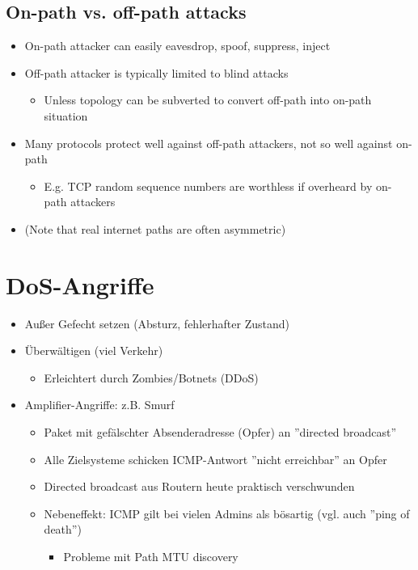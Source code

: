 \documentclass[openany]{book}
\begin{document}
\subsection{On-path vs. off-path attacks}

\begin{itemize}
    \item On-path attacker can easily eavesdrop, spoof, suppress, inject
    \item Off-path attacker is typically limited to blind attacks
    \begin{itemize}
        \item Unless topology can be subverted to convert off-path into on-path situation
    \end{itemize} 
    \item Many protocols protect well against off-path attackers, not so well against on-path
    \begin{itemize}
        \item E.g. TCP random sequence numbers are worthless if overheard by on-path attackers
    \end{itemize}
    \item (Note that real internet paths are often asymmetric)
\end{itemize}

\section{DoS-Angriffe}

\begin{itemize}
    \item Außer Gefecht setzen (Absturz, fehlerhafter Zustand)
    \item Überwältigen (viel Verkehr)
    \begin{itemize}
        \item Erleichtert durch Zombies/Botnets (DDoS)
    \end{itemize}
    \item Amplifier-Angriffe: z.B. Smurf
    \begin{itemize}
        \item Paket mit gefälschter Absenderadresse (Opfer) an ''directed broadcast''
        \item Alle Zielsysteme schicken ICMP-Antwort ''nicht erreichbar'' an Opfer
        \item Directed broadcast aus Routern heute praktisch verschwunden
        \item Nebeneffekt: ICMP gilt bei vielen Admins als bösartig (vgl. auch ''ping of death'')
        \begin{itemize}
            \item Probleme mit Path MTU discovery
        \end{itemize}
    \end{itemize}
\end{itemize}
\end{document}
